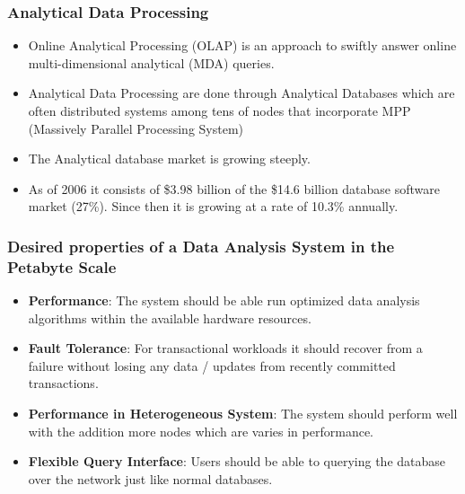 \documentclass{beamer}
\begin{document}
\begin{frame}
  \frametitle{Analytical Data Processing}
  \begin{itemize}
  \item Online Analytical Processing (OLAP) is an approach to swiftly
    answer online multi-dimensional analytical (MDA)
    queries. %
  \item Analytical Data Processing are done through Analytical Databases
    which are often distributed systems among tens of nodes that
    incorporate MPP (Massively Parallel Processing System)
  \item The Analytical database market is growing steeply.
  \item As of 2006 it consists of \$3.98 billion of the \$14.6 billion
    database software market (27\%). Since then it is growing at a rate of 10.3\% annually.
  \end{itemize}
\end{frame}

\begin{frame}
  \frametitle{Desired properties of a Data Analysis System in the
    Petabyte Scale}
  \begin{itemize}
  \item {\bfseries{Performance}}: The system should be able run
    optimized data analysis algorithms within the available hardware
    resources.
  \item {\bfseries{Fault Tolerance}}: For transactional workloads it should recover
    from a failure without losing any data / updates from recently
    committed transactions.
  \item {\bfseries{Performance in Heterogeneous System}}: The system should perform
    well with the addition more nodes which are varies in performance.
  \item {\bfseries{Flexible Query Interface}}: Users should be able to querying the database over the network just like normal databases.
  \end{itemize}
\end{frame}

\end{document}
